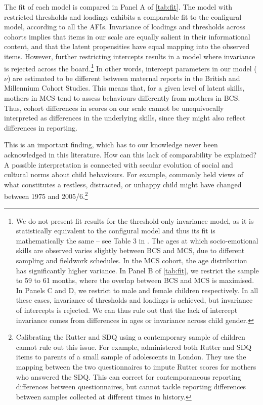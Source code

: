 The fit of each model is compared in Panel A of \autoref{tab:fit}. The model with restricted thresholds and loadings exhibits a comparable fit to the configural model, according to all the AFIs. Invariance of loadings and thresholds across cohorts implies that items in our scale are equally salient in their informational content, and that the latent propensities have equal mapping into the observed items. However, further restricting intercepts results in a model where invariance is rejected across the board.\footnote{We do not present fit results for the threshold-only invariance model, as it is statistically equivalent to the configural model and thus its fit is mathematically the same -- see Table 3 in \citealp{Wu2016a}. The ages at which socio-emotional skills are observed varies slightly between BCS and MCS, due to different sampling and fieldwork schedules. In the MCS cohort, the age distribution has significantly higher variance. In Panel B of \autoref{tab:fit}, we restrict the sample to 59 to 61 months, where the overlap between BCS and MCS is maximised. In Panels C and D, we restrict to male and female children respectively. In all these cases, invariance of thresholds and loadings is achieved, but invariance of intercepts is rejected. We can thus rule out that the lack of intercept invariance comes from differences in ages or invariance across child gender.} In other words, intercept parameters in our model ($\nu$) are estimated to be different between maternal reports in the British and Millennium Cohort Studies. This means that, for a given level of latent skills, mothers in MCS tend to assess behaviours differently from mothers in BCS. Thus, cohort differences in scores on our scale cannot be unequivocally interpreted as differences in the underlying skills, since they might also reflect differences in reporting.

This is an important finding, which has to our knowledge never been acknowledged in this literature. How can this lack of comparability be explained?  A possible interpretation is connected with secular evolution of social and cultural norms about child behaviours. For example, commonly held views of what constitutes a restless, distracted, or unhappy child might have changed between 1975 and 2005/6.\footnote{Calibrating the Rutter and SDQ using a contemporary sample of children cannot rule out this issue. For example, \cite{Collishaw2004} administered both Rutter and SDQ items to parents of a small sample of adolescents in London. They use the mapping between the two questionnaires to impute Rutter scores for mothers who answered the SDQ. This can correct for contemporaneous reporting differences between questionnaires, but cannot tackle reporting differences between samples collected at different times in history.}

